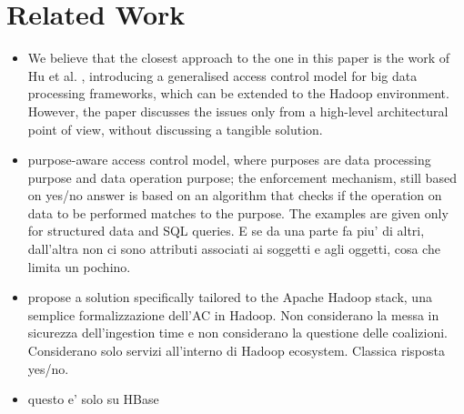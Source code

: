\section{Related Work}\label{sec:related}

\begin{itemize}
\item We believe that the closest approach to the one in this paper is the work of Hu et al. \cite{HUFerraiolo:2014}, introducing a generalised access control model for big data processing frameworks, which can be extended to the Hadoop environment. However, the paper discusses the issues only from a high-level architectural point of view, without discussing a tangible solution.
\item \cite{GuardSpark:ACSAC:2020}  purpose-aware access control model, where purposes are data processing purpose and data operation purpose; the enforcement mechanism, still based on yes/no answer is based on an algorithm that checks if the operation on data to be performed matches to the purpose. The examples are given only for structured data and SQL queries. E se da una parte fa piu' di altri, dall'altra non ci sono attributi associati ai soggetti e agli oggetti, cosa che limita un pochino.
\item \cite{Sandhu:ABAC:2018} propose a solution specifically tailored to the Apache Hadoop stack, una semplice formalizzazione dell'AC in Hadoop. Non considerano la messa in sicurezza dell'ingestion time e non considerano la questione delle coalizioni. Considerano solo servizi all'interno di Hadoop ecosystem. Classica risposta yes/no.
\item \cite{ABACforHBase:2019} questo e' solo su HBase
\end{itemize}
